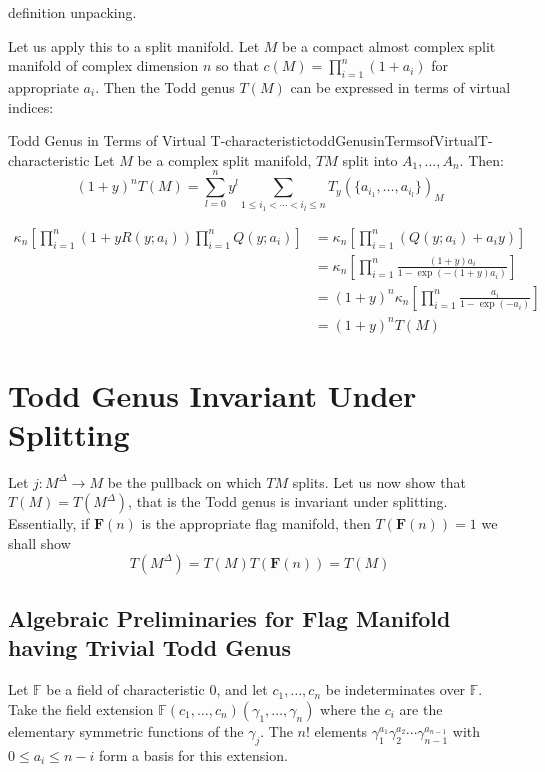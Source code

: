 \documentclass{book}
\newenvironment{Proof}[1][]
  {\begin{ProofTcb}[#1]}
  {\end{ProofTcb}}
\renewcommand{\bf}[1]{\textbf{#1}}
\begin{document}
\begin{Proof}
  definition unpacking.
\end{Proof}



Let us apply this to a split manifold. Let $M$ be a compact almost complex split manifold of complex dimension
$n$ so that $c(M) = \prod_{i=1}^n (1+a_i)$ for appropriate $a_i$. Then the Todd genus $T(M)$ can be expressed in terms of virtual indices:
\begin{prop}{Todd Genus in Terms of Virtual T-characteristic}{toddGenusinTermsofVirtualT-characteristic}
  Let $M$ be a complex split manifold, $TM$ split into $A_1, ..., A_n$. Then:
    \[
      (1+y)^n T(M) = \sum_{l=0}^n y^l \sum_{1\leq i_1<\cdots<i_l\leq n} T_y(\{a_{i_1},\ldots,a_{i_l}\})_M
  \]
\end{prop}

\begin{Proof}
\begin{align*}
  \kappa_n\left[\prod_{i=1}^n (1+yR(y;a_i)) \prod_{i=1}^n Q(y;a_i)\right]
  &= \kappa_n\left[\prod_{i=1}^n (Q(y;a_i) + a_i y)\right] \\
  &= \kappa_n\left[\prod_{i=1}^n \frac{(1+y)a_i}{1-\exp(-(1+y)a_i)}\right] \\
  &= (1+y)^n \kappa_n\left[\prod_{i=1}^n \frac{a_i}{1-\exp(-a_i)}\right]\\
  &= (1+y)^n T(M)
\end{align*}
\end{Proof}



\section{Todd Genus Invariant Under Splitting}\label{sec:ToddGenusSplittingInvariatn}

Let $j: M^\Delta \to M$ be the pullback on which $TM$ splits. Let us now show that $T(M) = T(M^\Delta)$, that
is the Todd genus is invariant under splitting. Essentially, if $\bf{F}(n)$ is the appropriate flag manifold,
then $T(\bf{F}(n)) = 1$ we shall show
\[
  T(M^\Delta) = T(M)T(\bf{F}(n)) = T(M)
\]

\subsection*{Algebraic Preliminaries for Flag Manifold having Trivial Todd Genus} \label{sec:AlgebraicPreliminaries}

Let $\mathbb{F}$ be a field of characteristic 0, and let $c_1, \dots, c_n$ be indeterminates over
$\mathbb{F}$. Take the field extension $\mathbb{F}(c_1, \dots, c_n)(\gamma_1, \dots, \gamma_n)$ where the $c_i$ are the elementary symmetric functions of the $\gamma_j$. The $n!$ elements $\gamma_1^{a_1} \gamma_2^{a_2} \cdots \gamma_{n-1}^{a_{n-1}}$ with $0 \le a_i \le n-i$ form a basis for this extension.
\end{document}

